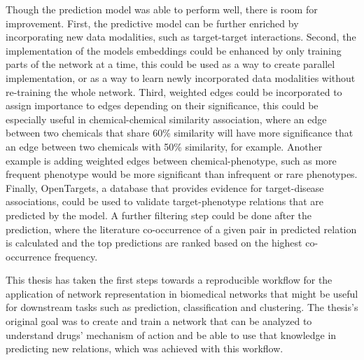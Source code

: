 Though the prediction model was able to perform well, there is room for improvement.
First, the predictive model can be further enriched by incorporating new data modalities, such as target-target interactions.
Second, the implementation of the models embeddings could be enhanced by only training parts of the network at a time, this could be used as a way to create parallel implementation, or as a way to learn newly incorporated data modalities without re-training the whole network.
Third, weighted edges could be incorporated to assign importance to edges depending on their significance, this could be especially useful in chemical-chemical similarity association, where an edge between two chemicals that share 60\% similarity will have more significance that an edge between two chemicals with 50\% similarity, for example.
Another example is adding weighted edges between chemical-phenotype, such as more frequent phenotype would be more significant than infrequent or rare phenotypes.
Finally, OpenTargets, a database that provides evidence for target-disease associations, could be used to validate target-phenotype relations that are predicted by the model.
A further filtering step could be done after the prediction, where the literature co-occurrence of a given pair in predicted relation is calculated and the top predictions are ranked based on the highest co-occurrence frequency.

This thesis has taken the first steps towards a reproducible workflow for the application of network representation in biomedical networks that might be useful for downstream tasks such as prediction, classification and clustering.
The thesis’s original goal was to create and train a network that can be analyzed to understand drugs’ mechanism of action and be able to use that knowledge in predicting new relations, which was achieved with this workflow.
